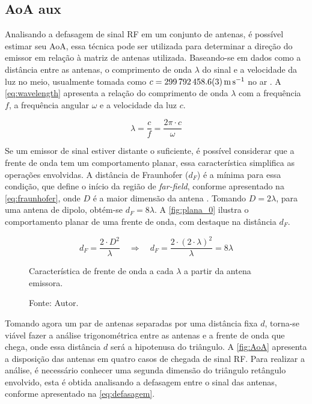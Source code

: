 \subsection{AoA aux}


Analisando a defasagem de sinal \ac{RF} em um conjunto de antenas, é possível estimar seu \acf{AoA}, essa técnica pode ser utilizada para determinar a direção do emissor em relação à matriz de antenas utilizada.
Baseando-se em dados como a distância entre as antenas, o comprimento de onda $\lambda$ do sinal e a velocidade da luz no meio, usualmente tomada como $c = \SI{299792458,6 \pm 0,3}{\metre\per\second}$ no ar \cite{jennings1987continuity, bensky2016wireless, horst2021localization}.
A \autoref{eq:wavelength} apresenta a relação do comprimento de onda $\lambda$ com a frequência $f$, a frequência angular $\omega$ e a velocidade da luz $c$.

\begin{equation} \label{eq:wavelength} %
    \lambda = \frac{c}{f} = \frac{2\pi \cdot c}{\omega}
\end{equation}

Se um emissor de sinal estiver distante o suficiente, é possível considerar que a frente de onda tem um comportamento planar, essa característica simplifica as operações envolvidas.
A distância de Fraunhofer ($d_F$) é a mínima para essa condição, que define o início da região de \textit{far-field}, conforme apresentado na \autoref{eq:fraunhofer}, onde $D$ é a maior dimensão da antena \cite{balanis2016antenna}.
Tomando $D = 2  \lambda$, para uma antena de dipolo, obtém-se $d_F = 8 \lambda$.
A \autoref{fig:plana_0} ilustra o comportamento planar de uma frente de onda, com destaque na distância $d_F$.

\begin{equation} \label{eq:fraunhofer}
    d_F = \frac{2 \cdot D^2}{\lambda} \quad \Rightarrow \quad d_F = \frac{2 \cdot \left(2 \cdot \lambda \right)^2}{\lambda} = 8 \lambda
\end{equation}

\begin{figure}[htpb]
    \centering
    \caption{Característica de frente de onda a cada $\lambda$ a partir da antena emissora.}
    
    \caption*{Fonte: Autor.}
    \label{fig:plana_0}
\end{figure}


Tomando agora um par de antenas separadas por uma distância fixa $d$, torna-se viável fazer a análise trigonométrica entre as antenas e a frente de onda que chega, onde essa distância $d$ será a hipotenusa do triângulo.
A \autoref{fig:AoA} apresenta a disposição das antenas em quatro casos de chegada de sinal \ac{RF}.
Para realizar a análise, é necessário conhecer uma segunda dimensão do triângulo retângulo envolvido, esta é obtida analisando a defasagem entre o sinal das antenas, conforme apresentado na \autoref{eq:defasagem}.


